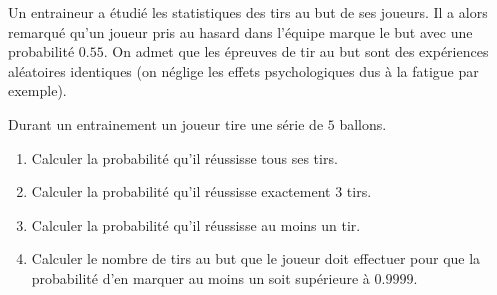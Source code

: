 
\begin{exercice}\label{exosmath-0383}

    Un entraineur a étudié les statistiques des tirs au but de ses joueurs. Il a alors remarqué qu'un joueur pris au hasard dans l'équipe marque le but avec une probabilité \( 0.55\). On admet que les épreuves de tir au but sont des expériences aléatoires identiques (on néglige les effets psychologiques dus à la fatigue par exemple). 

    Durant un entrainement un joueur tire une série de \( 5\) ballons.
    \begin{enumerate}
        \item
            Calculer la probabilité qu'il réussisse tous ses tirs.
        \item
            Calculer la probabilité qu'il réussisse exactement \( 3\) tirs.
        \item
            Calculer la probabilité qu'il réussisse au moins un tir.
        \item
            Calculer le nombre de tirs au but que le joueur doit effectuer pour que la probabilité d'en marquer au moins un soit supérieure à \( 0.9999\).
    \end{enumerate}

\end{exercice}
